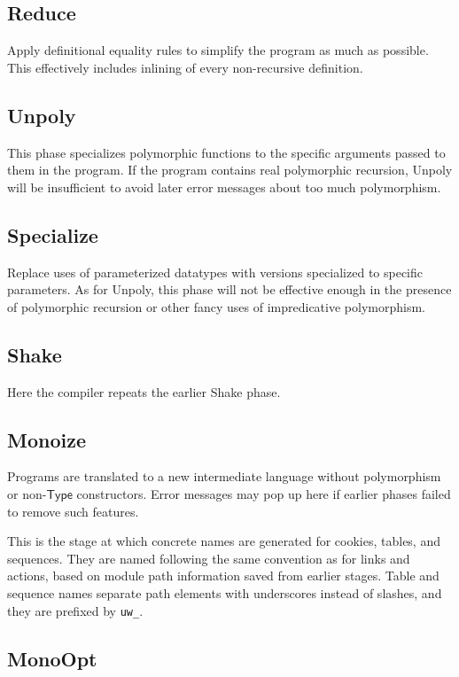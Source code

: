 \documentclass{article}
\newcommand{\mt}[1]{\mathsf{#1}}
\begin{document}
\subsection{Reduce}

Apply definitional equality rules to simplify the program as much as possible.  This effectively includes inlining of every non-recursive definition.

\subsection{Unpoly}

This phase specializes polymorphic functions to the specific arguments passed to them in the program.  If the program contains real polymorphic recursion, Unpoly will be insufficient to avoid later error messages about too much polymorphism.

\subsection{Specialize}

Replace uses of parameterized datatypes with versions specialized to specific parameters.  As for Unpoly, this phase will not be effective enough in the presence of polymorphic recursion or other fancy uses of impredicative polymorphism.

\subsection{Shake}

Here the compiler repeats the earlier Shake phase.

\subsection{Monoize}

Programs are translated to a new intermediate language without polymorphism or non-$\mt{Type}$ constructors.  Error messages may pop up here if earlier phases failed to remove such features.

This is the stage at which concrete names are generated for cookies, tables, and sequences.  They are named following the same convention as for links and actions, based on module path information saved from earlier stages.  Table and sequence names separate path elements with underscores instead of slashes, and they are prefixed by \texttt{uw\_}.

\subsection{MonoOpt}
\end{document}
